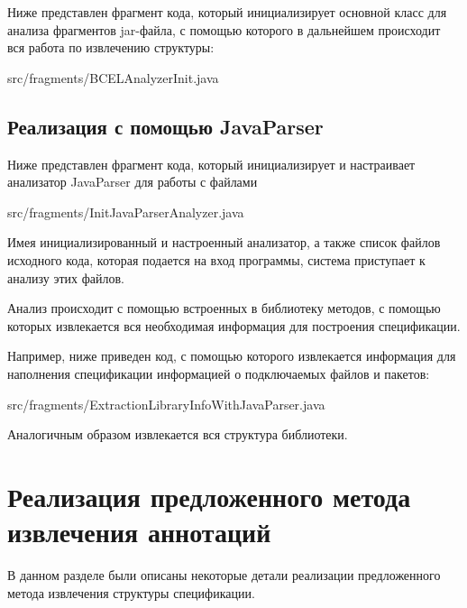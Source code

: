 Ниже представлен фрагмент кода, который инициализирует основной класс для анализа фрагментов jar-файла, с помощью которого в дальнейшем происходит вся работа по извлечению структуры:

{src/fragments/BCELAnalyzerInit.java}

\subsection{Реализация с помощью JavaParser}

Ниже представлен фрагмент кода, который инициализирует и настраивает анализатор JavaParser для работы с файлами

{src/fragments/InitJavaParserAnalyzer.java}

Имея инициализированный и настроенный анализатор, а также список файлов исходного кода, которая подается на вход программы, система приступает к анализу этих файлов.

Анализ происходит с помощью встроенных в библиотеку методов, с помощью которых извлекается вся необходимая информация для построения спецификации.

Например, ниже приведен код, с помощью которого извлекается информация для наполнения спецификации информацией о подключаемых файлов и пакетов:

{src/fragments/ExtractionLibraryInfoWithJavaParser.java}

Аналогичным образом извлекается вся структура библиотеки.

\section{Реализация предложенного метода извлечения аннотаций}

В данном разделе были описаны некоторые детали реализации предложенного метода извлечения структуры спецификации.


